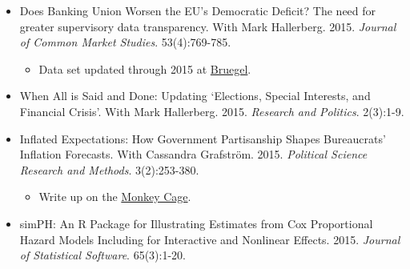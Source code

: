 \documentclass[a4paper]{article}
\begin{document}
{\begin{itemize}
\begin{itemize}
            \item Applied to understanding violence in the Turkish Parliament in \href{https://politicalviolenceataglance.org/2016/05/27/brawl-in-turkish-national-assembly-indicates-deeper-trouble/}{Political Violence @ a Glance}.

            \item Applied to understanding violence in the Ukrainian Parliament in \href{http://voxukraine.org/2015/12/24/causes-and-possible-solutions-to-brawling-in-the-ukrainian-parliament-en-2/}{VoxUkraine}.

            \item Write up on the \href{http://t.co/fETbFCXcYU}{Monkey Cage} with Emily Beaulieu.

        \end{itemize}

    \item Does Banking Union Worsen the EU's Democratic Deficit? The need for greater supervisory data transparency. With Mark Hallerberg. 2015. {\emph{Journal of Common Market Studies}}. 53(4):769-785.

        \begin{itemize}
            \item Data set updated through 2015 at \href{http://bruegel.org/2016/05/the-european-union-remains-a-laggard-on-banking-supervisory-transparency/}{Bruegel}.
        \end{itemize}

    \item When All is Said and Done: Updating `Elections, Special Interests, and Financial Crisis'. With Mark Hallerberg. 2015. \emph{Research and Politics}. 2(3):1-9.

    \item Inflated Expectations: How Government Partisanship Shapes Bureaucrats' Inflation Forecasts. With Cassandra Grafstr\"{o}m. 2015. {\emph{Political Science Research and Methods}}. 3(2):253-380.

    \begin{itemize}
        \item Write up on the \href{http://www.washingtonpost.com/blogs/monkey-cage/wp/2015/01/28/the-fed-cant-accurately-forecast-inflation-heres-why-this-may-hurt-democrats/}{Monkey Cage}.
    \end{itemize}

    \item simPH: An R Package for Illustrating Estimates from Cox Proportional Hazard Models Including for Interactive and Nonlinear Effects. 2015. {\emph{Journal of Statistical Software}}. 65(3):1-20.


\end{itemize}}
\end{document}

